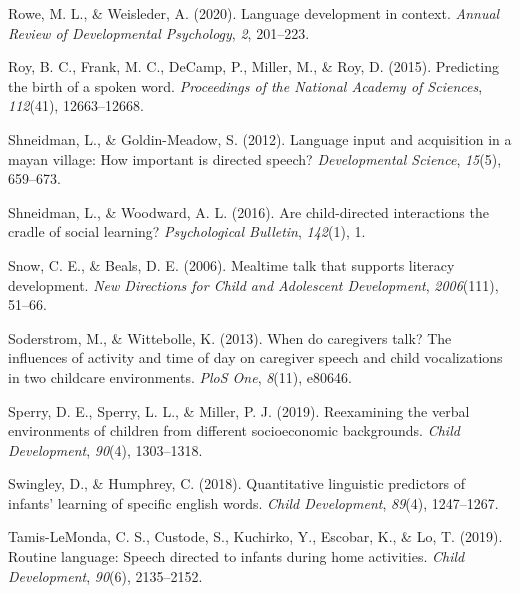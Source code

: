 \documentclass[
  man,floatsintext]{apa6}
\newlength{\cslhangindent}
\newlength{\cslentryspacingunit} %
\newenvironment{CSLReferences}[2] %
 {%
  \setlength{\parindent}{0pt}
  \ifodd #1
  \let\oldpar\par
  \def\par{\hangindent=\cslhangindent\oldpar}
  \fi
  \setlength{\parskip}{#2\cslentryspacingunit}
 }%
 {}
\begin{document}
\begin{CSLReferences}{1}{0}
\leavevmode{}%
Rowe, M. L., \& Weisleder, A. (2020). Language development in context. \emph{Annual Review of Developmental Psychology}, \emph{2}, 201--223.

\leavevmode{}%
Roy, B. C., Frank, M. C., DeCamp, P., Miller, M., \& Roy, D. (2015). Predicting the birth of a spoken word. \emph{Proceedings of the National Academy of Sciences}, \emph{112}(41), 12663--12668.

\leavevmode{}%
Shneidman, L., \& Goldin-Meadow, S. (2012). Language input and acquisition in a mayan village: How important is directed speech? \emph{Developmental Science}, \emph{15}(5), 659--673.

\leavevmode{}%
Shneidman, L., \& Woodward, A. L. (2016). Are child-directed interactions the cradle of social learning? \emph{Psychological Bulletin}, \emph{142}(1), 1.

\leavevmode{}%
Snow, C. E., \& Beals, D. E. (2006). Mealtime talk that supports literacy development. \emph{New Directions for Child and Adolescent Development}, \emph{2006}(111), 51--66.

\leavevmode{}%
Soderstrom, M., \& Wittebolle, K. (2013). When do caregivers talk? The influences of activity and time of day on caregiver speech and child vocalizations in two childcare environments. \emph{PloS One}, \emph{8}(11), e80646.

\leavevmode{}%
Sperry, D. E., Sperry, L. L., \& Miller, P. J. (2019). Reexamining the verbal environments of children from different socioeconomic backgrounds. \emph{Child Development}, \emph{90}(4), 1303--1318.

\leavevmode{}%
Swingley, D., \& Humphrey, C. (2018). Quantitative linguistic predictors of infants' learning of specific english words. \emph{Child Development}, \emph{89}(4), 1247--1267.

\leavevmode{}%
Tamis-LeMonda, C. S., Custode, S., Kuchirko, Y., Escobar, K., \& Lo, T. (2019). Routine language: Speech directed to infants during home activities. \emph{Child Development}, \emph{90}(6), 2135--2152.


\end{CSLReferences}
\end{document}
